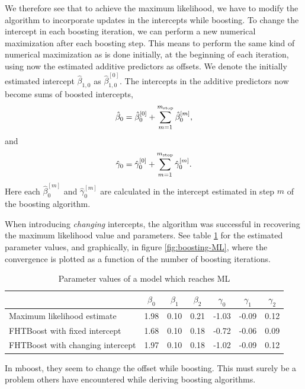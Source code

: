 We therefore see that to achieve the maximum likelihood, we have to modify the algorithm to incorporate updates in the intercepts while boosting.
To change the intercept in each boosting iteration, we can perform a new numerical maximization after each boosting step.
This means to perform the same kind of numerical maximization as is done initially, at the beginning of each iteration, using now the estimated additive predictors as offsets.
We denote the initially estimated intercept $\hat{\beta}_{1,0}$ as $\hat{\beta}_{1,0}^{[0]}$.
The intercepts in the additive predictors now become sums of boosted intercepts,
\begin{equation}
    \hat{\beta}_{0}=\hat{\beta}_{0}^{[0]}+\sum_{m=1}^{m_{\text{stop}}}\hat{\beta}_{0}^{[m]},
\end{equation}
and
\begin{equation}
    \hat{\gamma}_{0}=\hat{\gamma}_{0}^{[0]}+\sum_{m=1}^{m_{\text{stop}}}\hat{\gamma}_{0}^{[m]}.
\end{equation}
Here each $\hat{\beta}_{0}^{[m]}$ and $\hat{\gamma}_{0}^{[m]}$ are calculated in the intercept estimated in step $m$ of the boosting algorithm.

When introducing \textit{changing} intercepts, the algorithm was successful in recovering the maximum likelihood value and parameters.
See table \ref{table:ML} for the estimated parameter values, and graphically, in figure \ref{fig:boosting-ML}, where the convergence is plotted as a function of the number of boosting iterations.
\begin{table}\caption{Parameter values of a model which reaches ML}\label{table:ML}
\centering
\begin{tabular}{lcccccc}
\toprule
    & $\beta_{0}$ & $\beta_{1}$ & $\beta_{2}$ & $\gamma_{0}$ & $\gamma_{1}$ & $\gamma_{2}$ \\
\hline
Maximum likelihood estimate     &    1.98 &    0.10 &    0.21 &    -1.03 &    -0.09 &     0.12 \\
FHTBoost with fixed intercept                 &    1.68 &    0.10 &    0.18 &    -0.72 &    -0.06 &     0.09 \\
FHTBoost with changing intercept              &    1.97 &    0.10 &    0.18 &    -1.02 &    -0.09 &     0.12 \\
\bottomrule
\end{tabular}
\end{table}

In mboost, they seem to change the offset while boosting.
This must surely be a problem others have encountered while deriving boosting algorithms.

